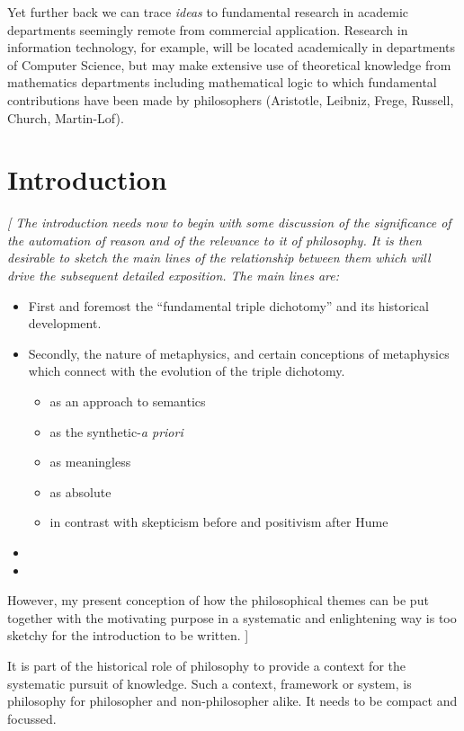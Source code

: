 Yet further back we can trace {\it ideas} to fundamental research in academic departments seemingly remote from commercial application.
Research in information technology, for example, will be located academically in departments of Computer Science, but may make extensive use of theoretical knowledge from mathematics departments including mathematical logic to which fundamental contributions have been made by philosophers (Aristotle, Leibniz, Frege, Russell, Church, Martin-Lof).

\chapter{Introduction}

{\it
[
The introduction needs now to begin with some discussion of the significance of the automation of reason and of the relevance to it of philosophy.
It is then desirable to sketch the main lines of the relationship between them which will drive the subsequent detailed exposition.
The main lines are:
\begin{itemize}
\item First and foremost the ``fundamental triple dichotomy'' and its historical development.
\item Secondly, the nature of metaphysics, and certain conceptions of metaphysics which connect with the evolution of the triple dichotomy.
\begin{itemize}
\item as an approach to semantics
\item as the synthetic-\emph{a priori}
\item as meaningless
\item as absolute
\item in contrast with skepticism before and positivism after Hume
\end{itemize}
\item 
\item
\end{itemize}

However, my present conception of how the philosophical themes can be put together with the motivating purpose in a systematic and enlightening way is too sketchy for the introduction to be written.
]
}

It is part of the historical role of philosophy to provide a context for the systematic pursuit of knowledge.
Such a context, framework or system, is philosophy for philosopher and non-philosopher alike.
It needs to be compact and focussed.

